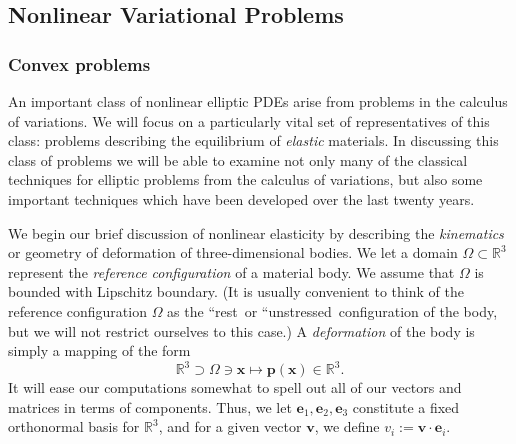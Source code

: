 \subsection{Nonlinear Variational Problems}\label{sec:nonlinear-variational-problems}

\subsubsection{Convex problems}\label{subsec:convex-variational-problems}

An important class of nonlinear elliptic PDEs arise from problems in the calculus of variations. We will focus on a particularly vital set of representatives of this class: problems describing the equilibrium of \emph{elastic} materials. In discussing this class of problems we will be able to examine not only many of the classical techniques for elliptic problems from the calculus of variations, but also some important techniques which have been developed over the last twenty years.

We begin our brief discussion of nonlinear elasticity by describing the \emph{kinematics} or geometry of deformation of three-dimensional bodies. We let a domain $\Omega\subset\mathbb{R}^3$ represent the \emph{reference configuration} of a material body. We assume that $\Omega$ is bounded with Lipschitz boundary. (It is usually convenient to think of the reference configuration $\Omega$ as the ``rest\textquotesingle\textquotesingle\ or ``unstressed\textquotesingle\textquotesingle\ configuration of the body, but we will not restrict ourselves to this case.) A \emph{deformation} of the body is simply a mapping of the form
\begin{equation}\label{eq:elasticity-reference-deformation-mapping}
\mathbb{R}^3\supset\Omega\ni\bm{x}\mapsto\bm{p}(\bm{x})\in\mathbb{R}^3.
\end{equation}
It will ease our computations somewhat to spell out all of our vectors and matrices in terms of components. Thus, we let $\bm{e}_1,\bm{e}_2,\bm{e}_3$ constitute a fixed orthonormal basis for $\mathbb{R}^3$, and for a given vector $\bm{v}$, we define $v_i:=\bm{v}\cdot\bm{e}_i$.

